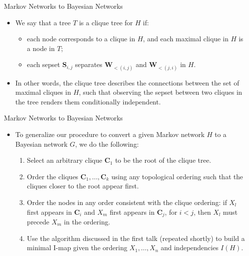 \documentclass[11pt]{beamer}
\begin{document}
\begin{frame}{Markov Networks to Bayesian Networks}
\begin{itemize}
	\item We say that a tree $T$ is a clique tree for $H$ if:
	\begin{itemize}
		\item each node corresponds to a clique in $H$, and each maximal
		clique in $H$ is a node in $T$;
		\item each sepset $\boldsymbol{S}_{i,j}$ separates
		$\boldsymbol{W}_{<(i,j)}$ and $\boldsymbol{W}_{<(j,i)}$ in $H$.
	\end{itemize}
	\item In other words, the clique tree describes the connections between
	the set of maximal cliques in $H$, such that observing the sepset
	between two cliques in the tree renders them conditionally independent.
\end{itemize}
\end{frame}

\begin{frame}{Markov Networks to Bayesian Networks}
\begin{itemize}
	\item To generalize our procedure to convert a given Markov network $H$
	to a Bayesian network $G$, we do the following:
	\begin{enumerate}
		\pause
		\item Select an arbitrary clique $\boldsymbol{C}_{1}$ to be the
		root of the clique tree.
		\pause
		\item Order the cliques $\boldsymbol{C}_{1}, \ldots,
		\boldsymbol{C}_{k}$ using any topological ordering such that the
		cliques closer to the root appear first.
		\pause
		\item Order the nodes in any order consistent with the clique
		ordering: if $X_{l}$ first appears in $\boldsymbol{C}_{i}$ and
		$X_{m}$ first appears in $\boldsymbol{C}_{j}$, for $i < j$, then
		$X_{l}$ must precede $X_{m}$ in the ordering.
		\pause
		\item Use the algorithm discussed in the first talk (repeated
		shortly) to build a minimal I-map given the ordering $X_{1},
		\ldots, X_{n}$ and independencies $I(H)$.
	\end{enumerate}
\end{itemize}
\end{frame}
\end{document}
